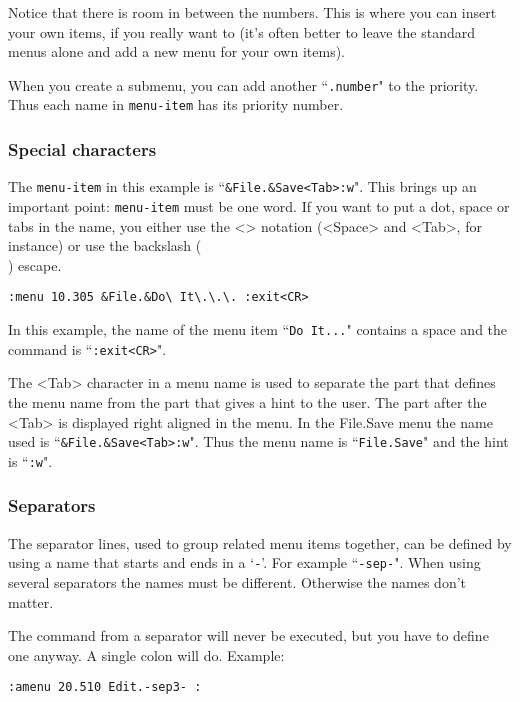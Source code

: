 Notice that there is room in between the numbers.
This is where you can insert your own items, if you really want to (it's often better to leave the standard menus alone and add a new menu for your own items).

When you create a submenu, you can add another ``\texttt{.number}" to the priority.
Thus each name in \texttt{{menu-item}} has its priority number.

\subsubsection{Special characters}
The \texttt{{menu-item}} in this example is ``\texttt{\&File.\&Save<Tab>:w}".
This brings up an important point: \texttt{{menu-item}} must be one word.
If you want to put a dot, space or tabs in the name, you either use the <> notation (<Space> and <Tab>, for instance) or use the backslash (\texttt{\\}) escape.

\begin{Verbatim}[samepage=true]
 :menu 10.305 &File.&Do\ It\.\.\. :exit<CR>
\end{Verbatim}

In this example, the name of the menu item ``\texttt{Do It...}" contains a space and the command is ``\texttt{:exit<CR>}".

The <Tab> character in a menu name is used to separate the part that defines the menu name from the part that gives a hint to the user.
The part after the <Tab> is displayed right aligned in the menu.
In the File.Save menu the name used is ``\texttt{\&File.\&Save<Tab>:w}".
Thus the menu name is ``\texttt{File.Save}" and the hint is ``\texttt{:w}".

\subsubsection{Separators}
The separator lines, used to group related menu items together, can be defined by using a name that starts and ends in a `\texttt{-}'.
For example ``\texttt{-sep-}".
When using several separators the names must be different.
Otherwise the names don't matter.

The command from a separator will never be executed, but you have to define one anyway.
A single colon will do.
Example:

\begin{Verbatim}[samepage=true]
 :amenu 20.510 Edit.-sep3- :
\end{Verbatim}
